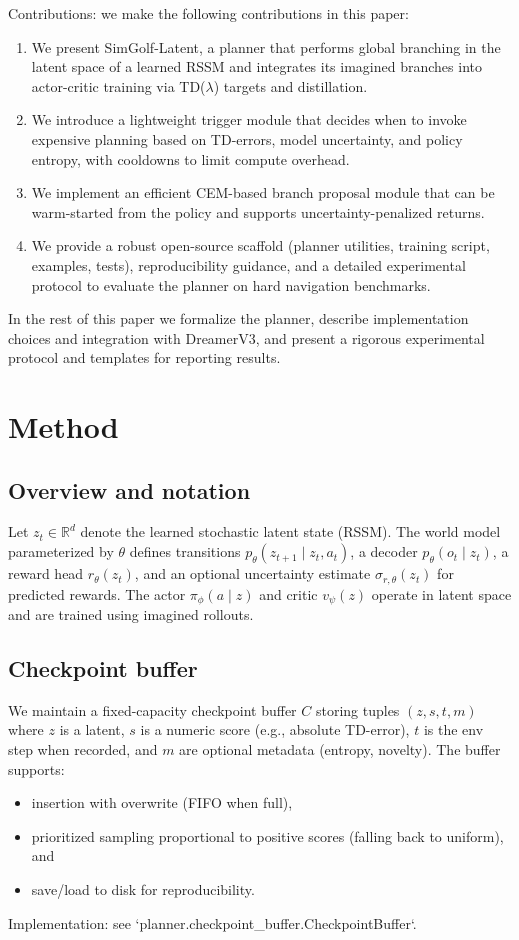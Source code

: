 \documentclass{article}
\begin{document}
Contributions: we make the following contributions in this paper:
\begin{enumerate}
\item We present SimGolf-Latent, a planner that performs global branching in the
latent space of a learned RSSM and integrates its imagined branches into
actor-critic training via TD(\(\lambda\)) targets and distillation.
\item We introduce a lightweight trigger module that decides when to invoke
expensive planning based on TD-errors, model uncertainty, and policy entropy,
with cooldowns to limit compute overhead.
\item We implement an efficient CEM-based branch proposal module that can be
warm-started from the policy and supports uncertainty-penalized returns.
\item We provide a robust open-source scaffold (planner utilities, training
script, examples, tests), reproducibility guidance, and a detailed experimental
protocol to evaluate the planner on hard navigation benchmarks.
\end{enumerate}

In the rest of this paper we formalize the planner, describe implementation
choices and integration with DreamerV3, and present a rigorous experimental
protocol and templates for reporting results.

\section{Method}
\subsection{Overview and notation}
Let \(z_t\in\mathbb{R}^d\) denote the learned stochastic latent state (RSSM). The
world model parameterized by \(\theta\) defines transitions
\(p_\theta(z_{t+1}\mid z_t,a_t)\), a decoder \(p_\theta(o_t\mid z_t)\), a reward head
\(r_\theta(z_t)\), and an optional uncertainty estimate \(\sigma_{r,\theta}(z_t)\)
for predicted rewards. The actor \(\pi_\phi(a\mid z)\) and critic
\(v_\psi(z)\) operate in latent space and are trained using imagined rollouts.

\subsection{Checkpoint buffer}
We maintain a fixed-capacity checkpoint buffer \(C\) storing tuples
\((z, s, t, m)\) where \(z\) is a latent, \(s\) is a numeric score (e.g., absolute TD-error),
\(t\) is the env step when recorded, and \(m\) are optional metadata (entropy,
novelty). The buffer supports:
\begin{itemize}
\item insertion with overwrite (FIFO when full),
\item prioritized sampling proportional to positive scores (falling back to uniform), and
\item save/load to disk for reproducibility.
\end{itemize}
Implementation: see `planner.checkpoint_buffer.CheckpointBuffer`.
\end{document}
